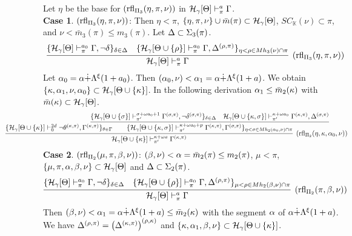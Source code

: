 \documentclass{article}
\newcommand{\mK}{\mathbb{K}}
\begin{document}
Let $\eta$ be the base for $({\rm rfl}_{\Pi_{3}}(\eta,\pi,\nu))$ in ${\cal H}_{\gamma}[\Theta]\vdash^{a}_{\pi}\Gamma$.
\\
\textbf{Case 1}. $({\rm rfl}_{\Pi_{3}}(\eta,\pi,\nu))$:
Then $\eta<\pi$, $\{\eta,\pi,\nu\}\cup\bar{m}(\pi)\subset{\cal H}_{\gamma}[\Theta]$, $SC_{\mK}(\nu)\subset\pi$,
and $\nu<\bar{m}_{3}(\pi)\leq m_{3}(\pi)$.
Let $\Delta\subset\Sigma_{3}(\pi)$.
{\small
\[
\infer[({\rm rfl}_{\Pi_{3}}(\eta,\pi,\nu))]{
\calh_{\gam}[\Tht]\vdash^{a}_{\pi}\Gam}
{
\{
\mathcal{H}_{\gam}[\Tht]\vdash^{a_{0}}_{\pi}\Gamma, \lnot\del
\}_{\del\in\Del}
&
\{
\mathcal{H}_{\gam}[\Tht\cup \{\rho\}]\vdash^{a_{0}}_{\pi}\Gamma, 
\Del^{(\rho,\pi)}\}_{\eta<\rho\in Mh_{3}(\nu)\cap \pi}
}
\]
}
Let $\alpha_{0}=\alpha\dot{+}\Lambda^{\xi}(1+a_{0})$. Then $(\alpha_{0},\nu)<\alpha_{1}=\alpha\dot{+}\Lambda^{\xi}(1+a)$.
We obtain $\{\kappa,\alpha_{1},\nu,\alpha_{0}\}\subset{\cal H}_{\gamma}[\Theta\cup\{\kappa\}]$.
In the following derivation $\alpha_{1}\leq\bar{m}_{2}(\kappa)$ with $\bar{m}(\kappa)\subset{\cal H}_{\gamma}[\Theta]$.
{\footnotesize
\[
\hspace{-20mm}
\infer[({\rm rfl}_{\Pi_{2}}(\eta,\kap,\alp_{0},\nu))]{\mathcal{H}_{\gam}[\Tht\cup \{\kap\}]\vdash^{\kap+\ome a}_{\pi^{\prime}}\Gam^{(\kap,\pi)}}
{
\{\mathcal{H}_{\gam}[\Tht\cup \{\kap\}]\vdash^{2d}_{0}\lnot\tht^{(\kap,\pi)},\Gam^{(\kap,\pi)}\}_{\tht\in\Gam}
&
\hspace{-15mm}
\infer{
\{\mathcal{H}_{\gam}[\Tht\cup \{\kap,\sig\}]\vdash^{\kap+\ome a_{0}+p}_{\pi^{\prime}}\Gamma^{(\kap,\pi)},\Gam^{(\sig,\pi)}\}_{\eta<\sig\in Mh_{2}(\alp_{0},\nu)\cap \pi}
}
 {
 \{
 \mathcal{H}_{\gam}[\Tht\cup \{\sig\}]\vdash^{\sig+\ome a_{0}+1}_{\pi^{\prime}}\Gamma^{(\sig,\pi)}, \lnot \del^{(\sig,\pi)}
 \}_{\del\in\Del}
 &
 \mathcal{H}_{\gam}[\Tht\cup \{\kap,\sig\}]\vdash^{\kap+\ome a_{0}}_{\pi^{\prime}}\Gamma^{(\kap,\pi)}, 
\Del^{(\sig,\pi)}
 }
}
\]
}
\textbf{Case 2}. $({\rm rfl}_{\Pi_{2}}(\mu,\pi,\beta,\nu))$:
$(\beta,\nu)<\alpha=\bar{m}_{2}(\pi)\leq m_{2}(\pi)$, $\mu<\pi$, 
$\{\mu,\pi,\alpha,\beta,\nu\}\subset{\cal H}_{\gamma}[\Theta]$ and $\Delta\subset\Sigma_{2}(\pi)$.
\[
\infer[({\rm rfl}_{\Pi_{2}}(\pi,\bet,\nu))]{
\calh_{\gam}[\Tht]\vdash^{a}_{\pi}\Gam}
{
\{
\mathcal{H}_{\gam}[\Tht]\vdash^{a_{0}}_{\pi}\Gamma, \lnot\del
\}_{\del\in\Del}
&
\{
\mathcal{H}_{\gam}[\Tht\cup \{\rho\}]\vdash^{a_{0}}_{\pi}\Gamma, 
\Del^{(\rho,\pi)}\}_{\mu<\rho\in Mh_{2}(\bet,\nu)\cap \pi}
}
\]
Then $(\beta,\nu)<\alpha_{1}=\alpha\dot{+}\Lambda^{\xi}(1+a)\leq \bar{m}_{2}(\kappa)$
with the segment $\alpha$ of $\alpha\dot{+}\Lambda^{\xi}(1+a)$.
We have $\Delta^{(\rho,\pi)}=\left(\Delta^{(\kappa,\pi)}\right)^{(\rho,\kappa)}$ and
$\{\kappa,\alpha_{1},\beta,\nu\}\subset{\cal H}_{\gamma}[\Theta\cup\{\kappa\}]$.
\end{document}
